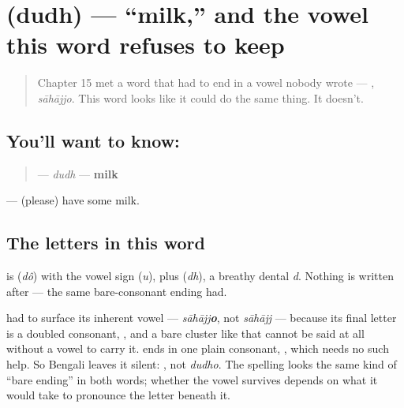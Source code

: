 \section[\texorpdfstring{\bn{দুধ} (dudh)}{দুধ (dudh)}]{ (dudh) — \textquotedblleft{}milk,\textquotedblright{} and the vowel this word refuses to keep}

\label{lesson:BN-C10-dudh}



\begin{quote}
Chapter 15 met a word that had to end in a vowel nobody wrote — , \emph{sāhājjo}. This word looks like it could do the same thing. It doesn't.
\end{quote}

\subsection*{You'll want to know: }
\begin{quote}
\textbf{} — \emph{dudh} — \textbf{milk}
\end{quote}

\textbf{ } — (please) have some milk.

\subsection*{The letters in this word}
\textbf{} is \textbf{} (\emph{dô}) with the vowel sign \textbf{} (\emph{u}), plus \textbf{} (\emph{dh}), a breathy dental \emph{d}. Nothing is written after  — the same bare-consonant ending  had.

\begin{sounds}
 had to surface its inherent vowel — \emph{sāhājj\textbf{o}}, not \emph{sāhājj} — because its final letter is a doubled consonant, \textbf{}, and a bare cluster like that cannot be said at all without a vowel to carry it.  ends in one plain consonant, , which needs no such help. So Bengali leaves it silent: \textbf{}, not \emph{dudho}. The spelling looks the same kind of \textquotedblleft{}bare ending\textquotedblright{} in both words; whether the vowel survives depends on what it would take to pronounce the letter beneath it.
\end{sounds}

